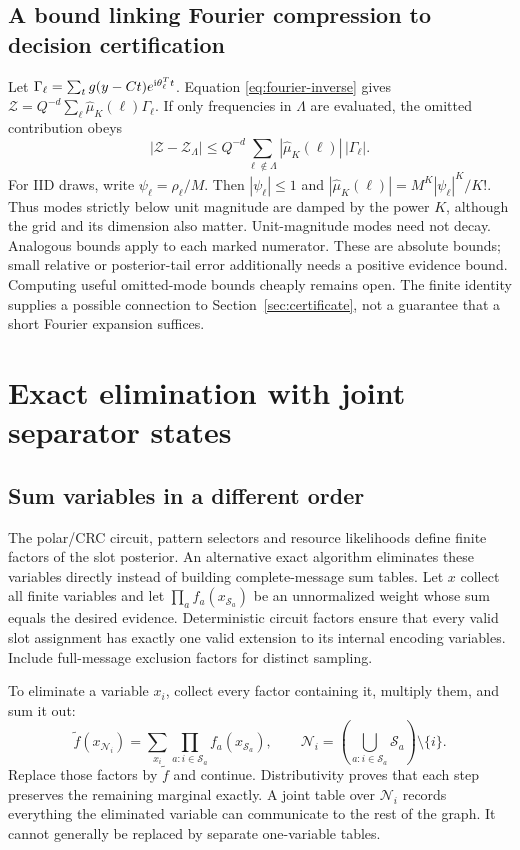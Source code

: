 \documentclass[10pt,a4paper]{article}
\begin{document}
\subsection{A bound linking Fourier compression to decision certification}
Let $\Gamma_\ell=\sum_t g(y-Ct)e^{{\rm i}\theta_\ell^Tt}$.
Equation \eqref{eq:fourier-inverse} gives $\mathcal Z=Q^{-d}\sum_\ell\widehat\mu_K(\ell)\Gamma_\ell$.
If only frequencies in $\Lambda$ are evaluated, the omitted contribution obeys
\begin{equation}
 |\mathcal Z-\mathcal Z_\Lambda|
 \leq Q^{-d}\sum_{\ell\notin\Lambda}|\widehat\mu_K(\ell)|\,|\Gamma_\ell|.
 \label{eq:fourier-bound}
\end{equation}
For IID draws, write $\psi_\ell=\rho_\ell/M$. Then $|\psi_\ell|\leq1$ and
$|\widehat\mu_K(\ell)|=M^K|\psi_\ell|^K/K!$.
Thus modes strictly below unit magnitude are damped by the power $K$, although the grid and its dimension also
matter. Unit-magnitude modes need not decay. Analogous bounds apply to each marked numerator.
These are absolute bounds; small relative or posterior-tail error additionally needs a positive evidence bound.
Computing useful omitted-mode bounds cheaply remains open. The finite identity supplies a possible connection
to Section~\ref{sec:certificate}, not a guarantee that a short Fourier expansion suffices.

\clearpage
\section{Exact elimination with joint separator states}
\label{sec:elimination-exact}
\subsection{Sum variables in a different order}
The polar/CRC circuit, pattern selectors and resource likelihoods define finite factors of the slot posterior.
An alternative exact algorithm eliminates these variables directly instead of building complete-message sum tables.
Let $x$ collect all finite variables and let $\prod_a f_a(x_{\mathcal S_a})$ be an unnormalized weight whose sum
equals the desired evidence. Deterministic circuit factors ensure that every valid slot assignment has exactly
one valid extension to its internal encoding variables. Include full-message exclusion factors for distinct sampling.

To eliminate a variable $x_i$, collect every factor containing it, multiply them, and sum it out:
\begin{equation}
 \widetilde f(x_{\mathcal N_i})
 =\sum_{x_i}\prod_{a:i\in\mathcal S_a}f_a(x_{\mathcal S_a}),
 \qquad
 \mathcal N_i=\left(\bigcup_{a:i\in\mathcal S_a}\mathcal S_a\right)\setminus\{i\}.
 \label{eq:eliminate}
\end{equation}
Replace those factors by $\widetilde f$ and continue. Distributivity proves that each step preserves the
remaining marginal exactly. A joint table over $\mathcal N_i$ records everything the eliminated variable can
communicate to the rest of the graph. It cannot generally be replaced by separate one-variable tables.
\end{document}
